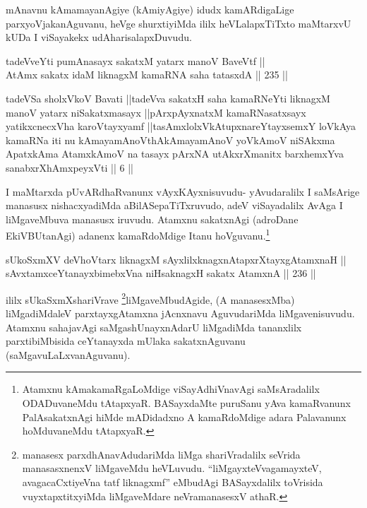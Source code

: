 \begin{artha}
mAnavnu kAmamayanAgiye (kAmiyAgiye) idudx kamARdigaLige
parxyoVjakanAguvanu, heVge shurxtiyiMda ililx heVLalapxTiTxto
maMtarxvU kUDa I viSayakekx udAharisalapxDuvudu.
\end{artha}


\begin{shl}
tadeVveYti pumAnasayx sakatxM yatarx manoV BaveVtf || \\
AtAmx sakatx idaM liknagxM kamaRNA saha tatasxdA \hfill || 235 ||  
\end{shl}

\begin{kandikeshl}
tadeVSa sholxVkoV Bavati ||tadeVva sakatxH saha kamaRNeYti liknagxM manoV yatarx niSakatxmasayx ||pArxpAyxnatxM kamaRNasatxsayx yatikxcnecxVha karoVtayxyamf ||tasAmxlolxVkAtupxnareYtayxsemxY loVkAya kamaRNa iti nu kAmayamAnoV\s thAkAmayamAnoV yoV\s kAmoV niSAkxma ApatxkAma AtamxkAmoV na tasayx pArxNA utAkxrXmanitx barxhemxYva sanabxrXhAmxpeyxVti || 6 ||
\end{kandikeshl}

\begin{artha}
I maMtarxda pUvARdhaRvanunx vAyxKAyxnisuvudu- yAvudaralilx I
saMsArige manasusx nishacxyadiMda aBilASepaTiTxruvudo, adeV
viSayadalilx AvAga I liMgaveMbuva manasusx iruvudu. Atamxnu sakatxnAgi
(adroDane EkiVBUtanAgi) adanenx kamaRdoMdige Itanu
hoVguvanu.\footnote{Atamxnu kAmakamaRgaLoMdige viSayAdhiVnavAgi
saMsAradalilx ODADuvaneMdu tAtapxyaR. BASayxdaMte puruSanu yAva
kamaRvanunx PalAsakatxnAgi hiMde mADidadxno A kamaRdoMdige adara
Palavanunx hoMduvaneMdu tAtapxyaR.}
\end{artha}


\begin{shl}
sUkoSxmXV deVhoV\s tarx liknagxM sAyxlilxknagxnAtapxrXtayxgAtamxnaH || \\
sAvxtamxceYtanayxbimebxVna niHsaknagxH sakatx AtamxnA \hfill || 236 ||  
\end{shl}

\begin{artha}
ililx sUkaSxmXshariVrave \footnote{manasesx parxdhAnavAdudariMda liMga
shariVradalilx seVrida manasasxnenxV liMgaveMdu heVLuvudu.
``liMgayxteV\s vagamayxteV, avagacaCxtiyeVna tatf liknagxmf'' eMbudAgi BASayxdalilx toVrisida vuyxtapxtitxyiMda
liMgaveMdare neVramanasesxV athaR.}liMgaveMbudAgide, (A manasesxMba)
liMgadiMdaleV parxtayxgAtamxna jAcnxnavu AguvudariMda liMgavenisuvudu.
Atamxnu sahajavAgi saMgashUnayxnAdarU liMgadiMda tananxlilx
parxtibiMbisida ceYtanayxda mUlaka sakatxnAguvanu
(saMgavuLaLxvanAguvanu).
\end{artha}

